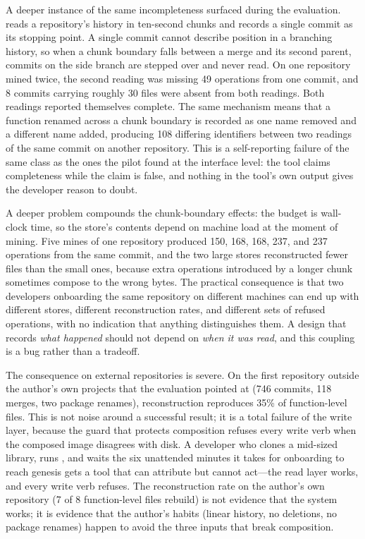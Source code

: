 A deeper instance of the same incompleteness surfaced during the evaluation. \sgt{}
reads a repository's history in ten-second chunks and records a single commit as
its stopping point. A single commit cannot describe position in a branching
history, so when a chunk boundary falls between a merge and its second parent,
commits on the side branch are stepped over and never read. On one repository
mined twice, the second reading was missing 49 operations from one commit, and
8 commits carrying roughly 30 files were absent from both readings. Both readings
reported themselves complete. The same mechanism means that a function renamed
across a chunk boundary is recorded as one name removed and a different name
added, producing 108 differing identifiers between two readings of the same
commit on another repository. This is a self-reporting failure of the same class as
the ones the pilot found at the interface level: the tool claims completeness while
the claim is false, and nothing in the tool's own output gives the developer
reason to doubt.

A deeper problem compounds the chunk-boundary effects: the budget is wall-clock
time, so the store's contents depend on machine load at the moment of mining.
Five mines of one repository produced 150, 168, 168, 237, and 237 operations from
the same commit, and the two large stores reconstructed fewer files than the small
ones, because extra operations introduced by a longer chunk sometimes compose to
the wrong bytes. The practical consequence is that two developers onboarding the
same repository on different machines can end up with different stores, different
reconstruction rates, and different sets of refused operations, with no indication
that anything distinguishes them. A design that records \emph{what happened} should
not depend on \emph{when it was read}, and this coupling is a bug rather than a
tradeoff.

The consequence on external repositories is severe. On the first repository
outside the author's own projects that the evaluation pointed \sgt{} at (746
commits, 118 merges, two package renames), reconstruction reproduces 35\% of
function-level files. This is not noise around a successful result; it is a total
failure of the write layer, because the guard that protects composition refuses
every write verb when the composed image disagrees with disk. A developer who
clones a mid-sized library, runs , and waits the six unattended
minutes it takes for onboarding to reach genesis gets a tool that can attribute
but cannot act---the read layer works, and every write verb refuses. The
reconstruction rate on the author's own repository (7 of 8 function-level files
rebuild) is not evidence that the system works; it is evidence that the author's
habits (linear history, no deletions, no package renames) happen to avoid the
three inputs that break composition.

